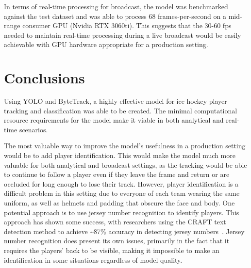 \documentclass[12pt,stu,donotrepeattitle,floatsintext]{apa7}
\newcommand{\customsection}[2]{
  \phantomsection
  \section*{#1}\label{#2}
  \addcontentsline{toc}{section}{#1}
}
\begin{document}
    In terms of real-time processing for broadcast, the model was benchmarked against the test dataset and was able to process 68 frames-per-second on a mid-range consumer GPU (Nvidia RTX 3060ti).
    This suggests that the 30-60 fps needed to maintain real-time processing during a live broadcast would be easily achievable with GPU hardware appropriate for a production setting.


    \customsection{Conclusions}{conclusions}

    Using YOLO and ByteTrack, a highly effective model for ice hockey player tracking and classification was able to be created.
    The minimal computational resource requirements for the model make it viable in both analytical and real-time scenarios.

    The most valuable way to improve the model's usefulness in a production setting would be to add player identification.
    This would make the model much more valuable for both analytical and broadcast settings, as the tracking would be able to continue to follow a player even if they leave the frame and return or are occluded for long enough to lose their track.
    However, player identification is a difficult problem in this setting due to everyone of each team wearing the same uniform, as well as helmets and padding that obscure the face and body.
    One potential approach is to use jersey number recognition to identify players.
    This approach has shown some success, with researchers using the CRAFT text detection method to achieve \textasciitilde87\% accuracy in detecting jersey numbers~\parencite{player-tracking}.
    Jersey number recognition does present its own issues, primarily in the fact that it requires the players' back to be visible, making it impossible to make an identification in some situations regardless of model quality.

    \printbibliography
    \clearpage
\end{document}
